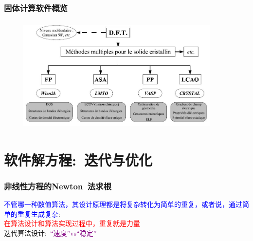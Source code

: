 \frame
{
	\frametitle{固体计算软件概览}
\begin{figure}[h!]
\centering
\vspace*{-0.05in}
\includegraphics[height=2.30in,width=4.00in,viewport=0 0 920 500,clip]{Figures/DFT-Software.jpg}
\label{Abinitio-Softwares}
\end{figure}
}

\section{软件解方程:~迭代与优化}
\frame
{
	\frametitle{非线性方程的\rm{Newton~}法求根}
	\textcolor{blue}{不管哪一种数值算法，其设计原理都是将复杂转化为简单的重复，或者说，通过简单的重复生成复杂}:\\
	\textcolor{red}{在算法设计和算法实现过程中，重复就是力量}\\
迭代算法设计:~\textcolor{purple}{“速度”\textrm{vs}“稳定”}
\begin{figure}[h!]
\centering
{}
\label{Equation_Newon}
\end{figure}
}

